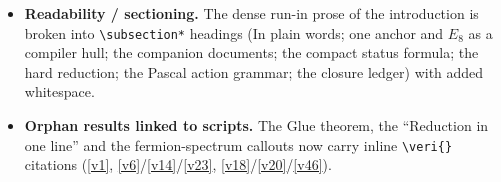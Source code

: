 \begin{itemize}
  \texttt{keyeq} sets off load-bearing display formulas. The introduction's callouts use the
  non-breaking variants (\texttt{keyboxnb}/\texttt{winboxnb}/\texttt{gapboxnb}) so no box splits across
  a page, and the shared status card is non-breaking.
\item \textbf{Readability / sectioning.} The dense run-in prose of the introduction is broken into
  \texttt{\textbackslash subsection*} headings (In plain words; one anchor and $E_8$ as a compiler
  hull; the companion documents; the compact status formula; the hard reduction; the Pascal action
  grammar; the closure ledger) with added whitespace.
\item \textbf{Orphan results linked to scripts.} The Glue theorem, the ``Reduction in one line'' and the
  fermion-spectrum callouts now carry inline \texttt{\textbackslash veri\{\}} citations
  (\vref{v1}, \vref{v6}/\vref{v14}/\vref{v23}, \vref{v18}/\vref{v20}/\vref{v46}).
\end{itemize}

